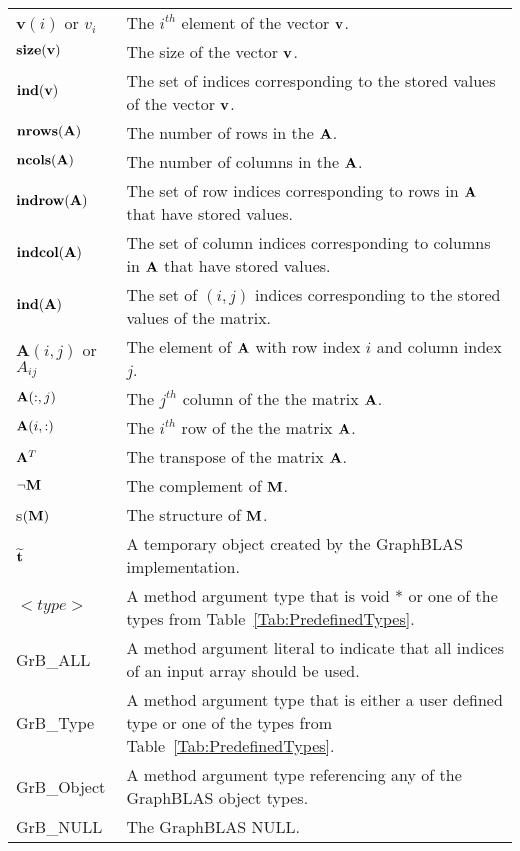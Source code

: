 \begin{tabular}[H]{l|p{5in}}
$\mathbf{v}(i)$ or $v_i$   & The $i^{th}$ element of the vector ${\bf v}$.\\
$\mathbf{size}({\bf v})$ & The size of the vector ${\bf v}$.\\
$\mathbf{ind}({\bf v})$ & The set of indices corresponding to the stored values of the vector ${\bf v}$.\\
$\mathbf{nrows}({\bf A})$ & The number of rows in the ${\bf A}$.\\
$\mathbf{ncols}({\bf A})$ & The number of columns in the ${\bf A}$.\\
$\mathbf{indrow}({\bf A})$ & The set of row indices corresponding to rows in ${\bf A}$ that have stored values.  \\
$\mathbf{indcol}({\bf A})$ & The set of column indices corresponding to columns in ${\bf A}$ that have stored values. \\
$\mathbf{ind}({\bf A})$ & The set of $(i,j)$ indices corresponding to the stored values of the matrix. \\
$\mathbf{A}(i,j)$ or $A_{ij}$ & The element of ${\bf A}$ with row index $i$ and column index $j$.\\
${\bf A}(:,j)$ & The $j^{th}$ column of the the matrix ${\bf A}$.\\
${\bf A}(i,:)$ & The $i^{th}$ row of the the matrix ${\bf A}$.\\
${\bf A}^T$ &The transpose of the matrix ${\bf A}$. \\
$\neg{\bf M}$ & The complement of ${\bf M}$.\\
s$({\bf M})$ & The structure of ${\bf M}$.\\
${\bf \widetilde{t}}$ & A temporary object created  by the GraphBLAS implementation. \\
$<type>$ & A method argument type that is {\sf void *} or one of the types from Table~\ref{Tab:PredefinedTypes}. \\
{\sf GrB\_ALL} & A method argument literal to indicate that all indices of an input array should be used.\\
{\sf GrB\_Type} & A method argument type that is either a user defined type or one of the  types from Table~\ref{Tab:PredefinedTypes}.\\
{\sf GrB\_Object} &  A method argument type referencing any of the GraphBLAS object types.\\
{\sf GrB\_NULL} & The GraphBLAS NULL.
\end{tabular}

